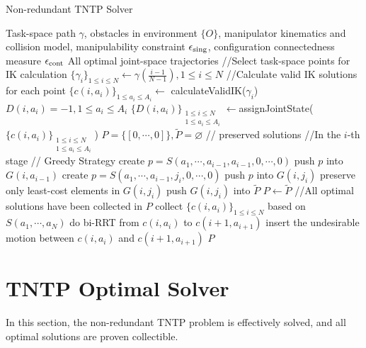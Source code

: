 \documentclass[letterpaper, 10 pt, conference]{ieeeconf}  %
\begin{document}
\begin{algorithm}[H]
    \caption{Non-redundant TNTP Solver}\label{alg:1}
    \begin{algorithmic}[1]
        \Require Task-space path $\gamma$, obstacles in environment $\{O\}$, manipulator kinematics and collision model, manipulability constraint $\epsilon_{\rm sing}$, configuration connectedness measure $\epsilon_{\rm cont}$
        \Ensure All optimal joint-space trajectories 
\State //Select task-space points for IK calculation
\State $\{\gamma_i\}_{1\leq i\leq N} \leftarrow \gamma(\frac{i-1}{N-1}), 1\leq i \leq N$
\State //Calculate valid IK solutions for each point
\State $\{c(i, a_i)\}_{1\leq a_i\leq A_i}\leftarrow$ calculateValidIK($\gamma_i$)
\State $D(i, a_i) = -1, 1\leq a_i\leq A_i$
\EndFor
\State $\{D(i, a_i)\}_{\substack{1\leq i\leq N\\1\leq a_i\leq A_i}}\leftarrow $assignJointState($\{c(i, a_i)\}_{\substack{1\leq i\leq N\\1\leq a_i\leq A_i}}$)
\State $P =\{[0, \cdots, 0]\}, \tilde{P} = \varnothing$ // preserved solutions
\State //In the $i$-th stage
\State // Greedy Strategy
\State create $p = S(a_1, \cdots, a_{i-1}, a_{i-1}, 0, \cdots, 0)$
\State push $p$ into $G(i, a_{i-1})$
\Else
{}
\State create $p = S(a_1, \cdots, a_{i-1}, j_i, 0, \cdots, 0)$
\State push $p$ into $G(i, j_i)$
\EndFor
\EndIf
\EndFor
{}
\State preserve only least-cost elements in $G(i, j_i)$
\State push $G(i, j_i)$ into $\tilde{P}$
\EndFor
\State $P \leftarrow \tilde{P}$
\EndFor
\State //All optimal solutions have been collected in $P$
\State collect $\{c(i, a_i)\}_{1\leq i\leq N}$ based on $S(a_1, \cdots, a_N)$
\State do bi-RRT from $c(i, a_i)$ to $c(i+1, a_{i+1})$ 
\State insert the undesirable motion between $c(i, a_i)$ and $c(i+1, a_{i+1})$
\EndIf
\EndFor
\EndFor
\State \Return $P$
    \end{algorithmic}  
\end{algorithm}



\section{TNTP Optimal Solver}\label{section:solution}
In this section, the non-redundant TNTP problem is effectively solved, and all optimal solutions are proven collectible. 
\end{document}
